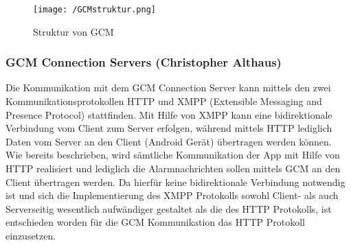 \begin{figure}[H]
\centering
\texttt{[image: /GCMstruktur.png]}
\caption{Struktur von GCM}
\label{fig:GCMstrukutr}
\end{figure}
\subsubsection{GCM Connection Servers    (Christopher Althaus)}
Die Kommunikation mit dem GCM Connection Server kann mittels den zwei Kommunikationsprotokollen HTTP und XMPP (Extensible Messaging and Presence Protocol) stattfinden. Mit Hilfe von XMPP kann eine bidirektionale Verbindung vom Client zum Server erfolgen, während mittels HTTP lediglich Daten vom Server an den Client (Android Gerät) übertragen werden können.\\
Wie bereits beschrieben, wird sämtliche Kommunikation der App mit Hilfe von HTTP realisiert und lediglich die Alarmnachrichten sollen mittels GCM an den Client übertragen werden. Da hierfür keine bidirektionale Verbindung notwendig ist und sich die Implementierung des XMPP Protokolls sowohl Client- als auch Serverseitig wesentlich aufwändiger gestaltet als die des HTTP Protokolls, ist entschieden worden für die GCM Kommunikation das HTTP Protokoll einzusetzen. 
